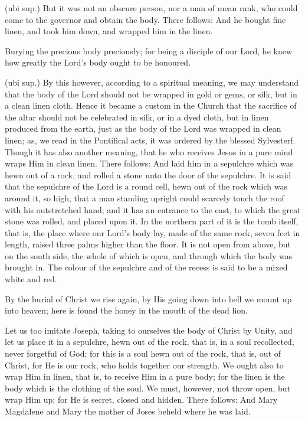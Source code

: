  (ubi sup.) But it was not an obscure person, nor a man of mean rank, who could come to the governor and obtain the body. There follows: And he bought fine linen, and took him down, and wrapped him in the linen.

 Burying the precious body preciously; for being a disciple of our Lord, he knew how greatly the Lord’s body ought to be honoured.

 (ubi sup.) By this however, according to a spiritual meaning, we may understand that the body of the Lord should not be wrapped in gold or gems, or silk, but in a clean linen cloth. Hence it became a custom in the Church that the sacrifice of the altar should not be celebrated in silk, or in a dyed cloth, but in linen produced from the earth, just as the body of the Lord was wrapped in clean linen; as, we read in the Pontifical acts, it was ordered by the blessed Sylvesterf. Though it has also another meaning, that he who receives Jesus in a pure mind wraps Him in clean linen. There follows: And laid him in a sepulchre which was hewn out of a rock, and rolled a stone unto the door of the sepulchre. It is said that the sepulchre of the Lord is a round cell, hewn out of the rock which was around it, so high, that a man standing upright could scarcely touch the roof with his outstretched hand; and it has an entrance to the east, to which the great stone was rolled, and placed upon it. In the northern part of it is the tomb itself, that is, the place where our Lord’s body lay, made of the same rock, seven feet in length, raised three palms higher than the floor. It is not open from above, but on the south side, the whole of which is open, and through which the body was brought in. The colour of the sepulchre and of the recess is said to be a mixed white and red.

 By the burial of Christ we rise again, by His going down into hell we mount up into heaven; here is found the honey in the mouth of the dead lion.

 Let us too imitate Joseph, taking to ourselves the body of Christ by Unity, and let us place it in a sepulchre, hewn out of the rock, that is, in a soul recollected, never forgetful of God; for this is a soul hewn out of the rock, that is, out of Christ, for He is our rock, who holds together our strength. We ought also to wrap Him in linen, that is, to receive Him in a pure body; for the linen is the body which is the clothing of the soul. We must, however, not throw open, but wrap Him up; for He is secret, closed and hidden. There follows: And Mary Magdalene and Mary the mother of Joses beheld where he was laid.

